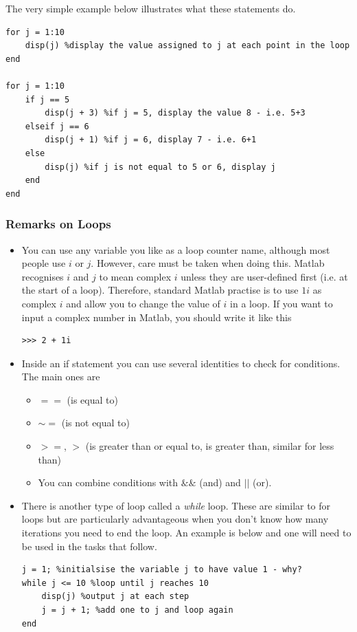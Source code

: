 \documentclass[12pt]{report}
\begin{document}
The very simple example below illustrates what these statements do.

\begin{lstlisting}
for j = 1:10
	disp(j) %display the value assigned to j at each point in the loop
end

for j = 1:10
	if j == 5
		disp(j + 3) %if j = 5, display the value 8 - i.e. 5+3
	elseif j == 6
		disp(j + 1) %if j = 6, display 7 - i.e. 6+1
	else
		disp(j) %if j is not equal to 5 or 6, display j
	end
end

\end{lstlisting}

\subsubsection{Remarks on Loops}

\begin{itemize}
\item You can use any variable you like as a loop counter name, although most people use $i$ or $j$. However, care must be taken when doing this. Matlab recognises $i$ and $j$ to mean complex $i$ unless they are user-defined first (i.e. at the start of a loop). Therefore, standard Matlab practise is to use $1i$ as complex $i$ and allow you to change the value of $i$ in a loop. If you want to input a complex number in Matlab, you should write it like this
\begin{lstlisting}
>>> 2 + 1i
\end{lstlisting}
\item Inside an if statement you can use several identities to check for conditions. The main ones are 
\begin{itemize}
\item $==$ (is equal to)
\item $\sim =$ (is not equal to)
\item $>=$, $>$ (is greater than or equal to, is greater than, similar for less than)
\item You can combine conditions with $\&\&$ (and) and $||$ (or).
\end{itemize}
\item There is another type of loop called a \textit{while} loop. These are similar to for loops but are particularly advantageous when you don't know how many iterations you need to end the loop. An example is below and one will need to be used in the tasks that follow.
\clearpage
\begin{lstlisting}
j = 1; %initialsise the variable j to have value 1 - why?
while j <= 10 %loop until j reaches 10
    disp(j) %output j at each step
    j = j + 1; %add one to j and loop again
end
\end{lstlisting}
\end{itemize}
\end{document}
